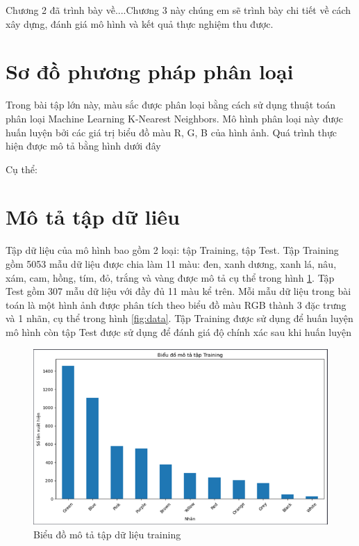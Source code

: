 \documentclass[../BTL.tex]{subfiles}
\begin{document}
Chương 2 đã trình bày về....Chương 3 này chúng em sẽ trình bày chi tiết về cách xây dựng, đánh giá mô hình và kết quả thực nghiệm thu được.
\section{Sơ đồ phương pháp phân loại}
Trong bài tập lớn này, màu sắc được phân loại bằng cách sử dụng thuật toán phân loại Machine Learning K-Nearest Neighbors. Mô hình phân loại này được huấn luyện bởi các giá trị biểu đồ màu R, G, B của hình ảnh. Quá trình thực hiện được mô tả bằng hình dưới đây

Cụ thể:

\section{Mô tả tập dữ liêu}
Tập dữ liệu của mô hình bao gồm 2 loại: tập Training, tập Test. Tập Training gồm 5053 mẫu dữ liệu được chia làm 11 màu: đen, xanh dương, xanh lá, nâu, xám, cam, hồng, tím, đỏ, trắng và vàng được mô tả cụ thể trong hình \ref{fig: data_training}. Tập Test gồm 307 mẫu dữ liệu với đầy đủ 11 màu kể trên. Mỗi mẫu dữ liệu trong bài toán là một hình ảnh được phân tích theo biểu đồ màu RGB thành 3 đặc trưng và 1 nhãn, cụ thể trong hình \ref{fig:data}. Tập Training được sử dụng để huấn luyện mô hình còn tập Test được sử dụng để đánh giá độ chính xác sau khi huấn luyện
\begin{figure}[h]
    \centering
    \includegraphics[scale = 0.85]{BTL BaoCao Latex TTNT/Anh/mô tả tập Training.png}
    \caption{Biểu đồ mô tả tập dữ liệu training}
    \captionsetup{justification=centering}
    \label{fig: data_training}
\end{figure}
\hfill
\end{document}
